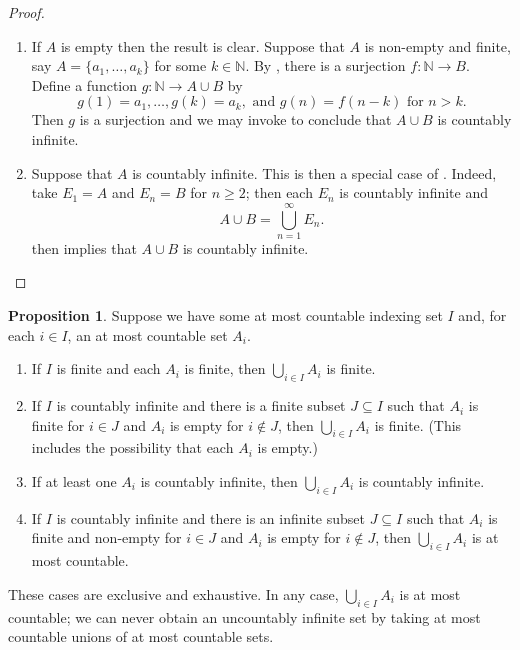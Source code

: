 \documentclass[12pt]{article}
\theoremstyle{definition}
\newtheorem{proposition}[definition]{Proposition}
\begin{document}
\begin{proof}
    \begin{enumerate}[label = (\roman*)]
        \item If \( A \) is empty then the result is clear. Suppose that \( A \) is non-empty and finite, say \( A = \{ a_1, \ldots, a_k \} \) for some \( k \in \mathbb{N} \). By , there is a surjection \( f : \mathbb{N} \to B \). Define a function \( g : \mathbb{N} \to A \cup B \) by
        \[
            g(1) = a_1, \ldots, g(k) = a_k, \text{ and  } g(n) = f(n - k) \text{ for } n > k.
        \]
        Then \( g \) is a surjection and we may invoke  to conclude that \( A \cup B \) is countably infinite.

        \item Suppose that \( A \) is countably infinite. This is then a special case of . Indeed, take \( E_1 = A \) and \( E_n = B \) for \( n \geq 2 \); then each \( E_n \) is countably infinite and
        \[
            A \cup B = \bigcup_{n=1}^{\infty} E_n.
        \]
         then implies that \( A \cup B \) is countably infinite. \qedhere
    \end{enumerate}
\end{proof}

\begin{proposition}
\label{prop:amc_union_of_amc_sets_is_amc}
    Suppose we have some at most countable indexing set \( I \) and, for each \( i \in I \), an at most countable set \( A_i \).
    \begin{enumerate}[label = (\roman*)]
        \item If \( I \) is finite and each \( A_i \) is finite, then \( \bigcup_{i \in I} A_i \) is finite.
        
        \item If \( I \) is countably infinite and there is a finite subset \( J \subseteq I \) such that \( A_i \) is finite for \( i \in J \) and \( A_i \) is empty for \( i \not\in J \), then \( \bigcup_{i \in I} A_i \) is finite. (This includes the possibility that each \( A_i \) is empty.)
        
        \item If at least one \( A_i \) is countably infinite, then \( \bigcup_{i \in I} A_i \) is countably infinite.

        \item If \( I \) is countably infinite and there is an infinite subset \( J \subseteq I \) such that \( A_i \) is finite and non-empty for \( i \in J \) and \( A_i \) is empty for \( i \not\in J \), then \( \bigcup_{i \in I} A_i \) is at most countable.
    \end{enumerate}
    These cases are exclusive and exhaustive. In any case, \( \bigcup_{i \in I} A_i \) is at most countable; we can never obtain an uncountably infinite set by taking at most countable unions of at most countable sets.
\end{proposition}
\end{document}
